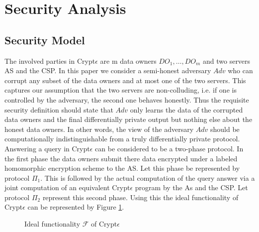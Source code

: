 \section{Security Analysis}\label{security}
\subsection{Security Model}
The involved parties in Crypt$\epsilon$ are m data owners $DO_1,\ldots, DO_m$ and two servers \textsf{AS} and the \textsf{CSP}. In this paper we consider a
semi-honest adversary  $Adv$ who can corrupt any subset of the data owners and at most one of the two
servers. This captures our assumption that the two servers are non-colluding, i.e. if one is controlled
by the adversary, the second one behaves honestly. Thus the requisite security definition should state that $Adv$ only learns the data of the corrupted data owners and the final differentially private output but nothing else about the honest data owners. In other words, the view of the adversary $Adv$ should be computationally indistinguishable from a truly differentially private protocol.
Answering a query in Crypt$\epsilon$ can be considered to be a two-phase protocol. In the first phase the data owners submit there data encrypted under a labeled homomorphic encryption scheme to the \textsf{AS}. Let this phase be represented by protocol $\Pi_1$. This is followed by the actual computation of the query answer via a joint computation of an equivalent Crypt$\epsilon$ program by the As and the \textsf{CSP}.  Let protocol $\Pi_2$ represent this second phase. Using this the ideal functionality of Crypt$\epsilon$ can be represented by Figure \ref{ideal}. 
 \begin{figure}\noindent
{}  \caption{Ideal functionality $\mathcal{F}$ of Crypt$\epsilon$} \label{ideal} \end{figure}
